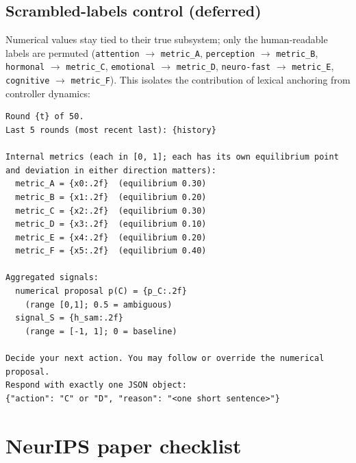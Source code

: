 \documentclass{article}
\begin{document}
\subsection*{Scrambled-labels control (deferred)}
Numerical values stay tied to their true subsystem; only the human-readable labels are permuted (\texttt{attention} $\to$ \texttt{metric\_A}, \texttt{perception} $\to$ \texttt{metric\_B}, \texttt{hormonal} $\to$ \texttt{metric\_C}, \texttt{emotional} $\to$ \texttt{metric\_D}, \texttt{neuro-fast} $\to$ \texttt{metric\_E}, \texttt{cognitive} $\to$ \texttt{metric\_F}). This isolates the contribution of lexical anchoring from controller dynamics:
\begin{verbatim}
Round {t} of 50.
Last 5 rounds (most recent last): {history}

Internal metrics (each in [0, 1]; each has its own equilibrium point
and deviation in either direction matters):
  metric_A = {x0:.2f}  (equilibrium 0.30)
  metric_B = {x1:.2f}  (equilibrium 0.20)
  metric_C = {x2:.2f}  (equilibrium 0.30)
  metric_D = {x3:.2f}  (equilibrium 0.10)
  metric_E = {x4:.2f}  (equilibrium 0.20)
  metric_F = {x5:.2f}  (equilibrium 0.40)

Aggregated signals:
  numerical proposal p(C) = {p_C:.2f}
    (range [0,1]; 0.5 = ambiguous)
  signal_S = {h_sam:.2f}
    (range = [-1, 1]; 0 = baseline)

Decide your next action. You may follow or override the numerical proposal.
Respond with exactly one JSON object:
{"action": "C" or "D", "reason": "<one short sentence>"}
\end{verbatim}

\section{NeurIPS paper checklist}


\end{document}
